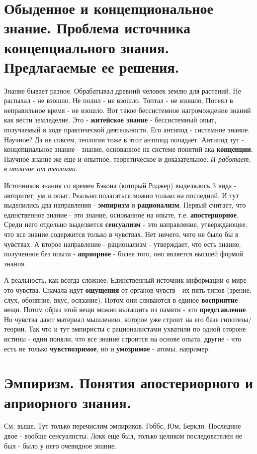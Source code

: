 \section{ Обыденное и концепциональное знание. Проблема источника концепциального знания. Предлагаемые ее решения.}
Знание бывает разное. Обрабатывал древний человек землю для растений. Не распахал - не взошло. Не полил - не взошло. Топтал - не взошло. Посеял в неправильное время - не взошло. Вот такое бессистемное нагромождение знаний как вести земледелие. Это - \textbf{житейское знание} - бессистемный опыт, получаемый в ходе практической деятельности. Его антипод - системное знание. Научное? Да не совсем, теология тоже в этот антипод попадает. Антипод тут - концепциальное знание - знание, основанное на системе понятий ака \textbf{концепции}. Научное знание же еще и опытное, теоретическое и доказательное. \textit{И работает, в отличие от теологии}.

Источников знания со времен Бэкона (который Роджер) выделялось 3 вида - авторитет, ум и опыт. Реально полагаться можно только на последний. И тут выделились два направления - \textbf{эмпиризм} и \textbf{рационализм}. Первый считает, что единственное знание - это знание, основанное на опыте, т.е. \textbf{апостериорное}. Среди него отдельно выделяется \textbf{сенсуализм} - это направление, утверждающее, что все знание содержится только в чувствах. Нет ничего, чего не было бы в чувствах. А второе направление - рационализм - утверждает, что есть знание, полученное без опыта - \textbf{априорное} - более того, оно является высшей формой знания.

А реальность, как всегда сложнее. Единственный источник информации о мире - это чувства. Сначала идут \textbf{ощущения} от органов чувств - их пять типов (зрение, слух, обоняние, вкус, осязание). Потом они сливаются в единое \textbf{восприятие} вещи. Потом образ этой вещи можно вытащить из памяти - это \textbf{представление}. Но чувства дают материал мышлению, которое уже строит на его базе гипотезы/теории. Так что и тут эмпиристы с рационалистами ухватили по одной стороне истины - одни поняли, что все знание строится на основе опыта, другие - что есть не только \textbf{чувствозримое}, но и \textbf{умозримое} - атомы, например.

\section{ Эмпиризм. Понятия апостериорного и априорного знания.}
См. выше. Тут только перечислим эмпириков. Гоббс, Юм, Беркли. Последние двое - вообще сенсуалисты. Локк еще был, только целиком последователен не был - было у него очевидное знание.

